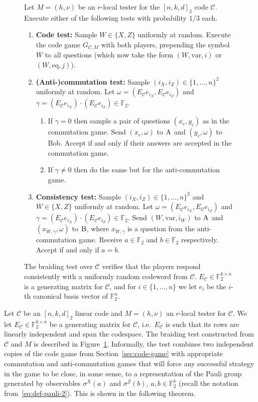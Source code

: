 \documentclass[11pt]{article}
\theoremstyle{definition}
\newcommand{\code}{\mathscr{C}}
\newcommand{\field}{\mathbb{F}_2}
\newcommand{\F}{\ensuremath{\mathbb{F}}}
\newcommand{\eq}{\mathrm{eq}}
\newcommand{\var}{\mathrm{var}}
\newcommand{\labelstyle}[1]{\ensuremath{\textsc{#1}}\xspace}
\newcommand{\alice}{\labelstyle{A}}
\newcommand{\bob}{\labelstyle{B}}
\newenvironment{gamespec}{
  \begin{mdframed}[style=figstyle]}{
  \end{mdframed}}
\begin{document}
\begin{figure}[!htbp]
  \centering
  \begin{gamespec}
Let $M=(h,\nu)$ be an $r$-local tester for the $[n,k,d]_2$ code $\code$.  Execute either of the following tests with probability $1/3$ each. 
    \begin{enumerate}
      \setlength\itemsep{1pt}
    \item \textbf{Code test:} Sample $W\in \{X,Z\}$ uniformly at random. Execute the code game $G_{\code,M}$ with both players, prepending the symbol $W$ to all questions (which now take the form $(W,\var,i)$ or $(W,\eq,j)$). 
		
    \item \textbf{(Anti-)commutation test:} Sample $(i_X,i_Z)\in \{1,\ldots,n\}^2 $ uniformly at random. Let $\omega = (E_\code e_{i_X}, E_\code e_{i_Z})$ and $\gamma =  (E_\code e_{i_X}) \cdot(E_\code e_{i_Z}) \in \field$. 
		\begin{enumerate} 
		\item If $\gamma=0$ then sample a pair of questions $(x_c,y_c)$ as in the commutation game. Send $(x_c,\omega)$ to $\alice$ and $(y_c,\omega)$ to Bob. Accept if and only if their answers are accepted in the commutation game. 
		\item If $\gamma\neq 0$ then do the same but for the anti-commutation game. 
		\end{enumerate} 
		 \item \textbf{Consistency test:} Sample $(i_X,i_Z)\in \{1,\ldots,n\}^2 $ and $W\in \{X,Z\}$ uniformly at random. Let $\omega=(E_\code e_{i_X}, E_\code e_{i_Z})$ and $\gamma = (E_\code e_{i_X}) \cdot(E_\code e_{i_Z}) \in \field$. Send $(W,\var,i_W)$ to $\alice$ and $(x_{W,\gamma},\omega)$ to $\bob$, where $x_{W,\gamma}$ is a question from the anti-commutation game. Receive $a\in \field$ and $b\in \field$ respectively. Accept if and only if $a=b$. 
    \end{enumerate}
  \end{gamespec}
  \caption{The braiding test over $\code$ verifies that the players respond consistently with a uniformly random codeword from $\code$. $E_\code \in \F_2^{k\times n}$ is a generating matrix for $\code$, and for $i\in\{1,\ldots,n\}$ we let $e_i$ be the $i$-th canonical basis vector of $\F_2^n$.}
  \label{fig:braiding-test}
\end{figure}

Let $\code$ be an $[n,k,d]_2$ linear code and $M=(h,\nu)$ an $r$-local tester for $\code$. We let $E_\code\in\F_2^{k\times n}$ be a generating matrix for $\code$, i.e.\ $E_\code$ is such that its rows are linearly independent and span the codespace. 
 The braiding test constructed from $\code$ and $M$ is described in Figure~\ref{fig:braiding-test}. Informally, the test combines two independent copies of the code game from Section~\ref{sec:code-game} with appropriate commutation and anti-commutation games that will force any successful strategy in the game to be close, in some sense, to a representation of the Pauli group generated by observables $\sigma^X(a)$ and $\sigma^Z(b)$, $a,b\in \F_2^k$ (recall the notation from~\eqref{eq:def-pauli-2}). This is shown in the following theorem. 
\end{document}
